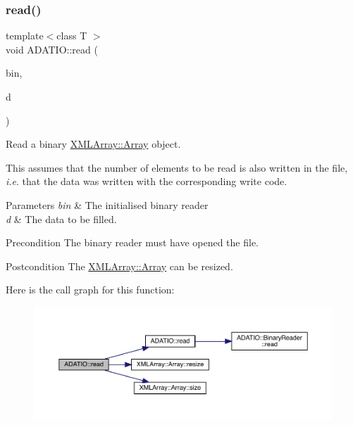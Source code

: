 \subsubsection{\texorpdfstring{read()}{read()}\hspace{0.1cm}{\footnotesize\ttfamily [16/28]}}
{\footnotesize\ttfamily template$<$class T $>$ \\
void A\+D\+A\+T\+I\+O\+::read (\begin{DoxyParamCaption}\item[{\mbox{\hyperlink{classADATIO_1_1BinaryReader}{Binary\+Reader}} \&}]{bin,  }\item[{\mbox{\hyperlink{classXMLArray_1_1Array}{X\+M\+L\+Array\+::\+Array}}$<$ T $>$ \&}]{d }\end{DoxyParamCaption})\hspace{0.3cm}{\ttfamily [inline]}}



Read a binary \mbox{\hyperlink{classXMLArray_1_1Array}{X\+M\+L\+Array\+::\+Array}} object. 

This assumes that the number of elements to be read is also written in the file, {\itshape i.\+e}. that the data was written with the corresponding write code. 
\begin{DoxyParams}{Parameters}
{\em bin} & The initialised binary reader \\
\hline
{\em d} & The data to be filled.\\
\hline
\end{DoxyParams}
\begin{DoxyPrecond}{Precondition}
The binary reader must have opened the file. 
\end{DoxyPrecond}
\begin{DoxyPostcond}{Postcondition}
The \mbox{\hyperlink{classXMLArray_1_1Array}{X\+M\+L\+Array\+::\+Array}} can be resized. 
\end{DoxyPostcond}
Here is the call graph for this function\+:
\nopagebreak
\begin{figure}[H]
\begin{center}
\leavevmode
\includegraphics[width=350pt]{d0/dba/namespaceADATIO_a16a912dec3b1d1424a44c9f1a6cd915f_cgraph}
\end{center}
\end{figure}
\mbox{\label{namespaceADATIO_ab39e59b5ba8a584a1c5afd164173b9e7}} 
